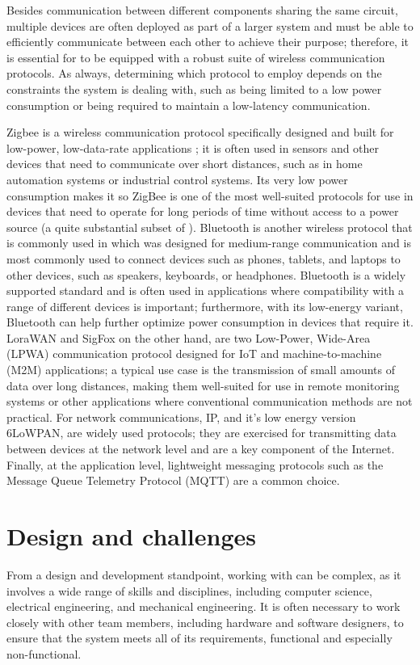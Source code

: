 Besides communication between different components sharing the same circuit, multiple devices are often deployed as part of a larger system and must be able to efficiently communicate between each other to achieve their purpose; therefore, it is essential for \ess to be equipped with a robust suite of wireless communication protocols. As always, determining which protocol to employ depends on the constraints the system is dealing with, such as being limited to a low power consumption or being required to maintain a low-latency communication.

Zigbee is a wireless communication protocol specifically designed and built for low-power, low-data-rate applications \cite{Zigbee}; it is often used in sensors and other devices that need to communicate over short distances, such as in home automation systems or industrial control systems. Its very low power consumption makes it so ZigBee is one of the most well-suited protocols for use in devices that need to operate for long periods of time without access to a power source (\ie a quite substantial subset of \ess).
Bluetooth is another wireless protocol that is commonly used in \es which was designed for medium-range communication and is most commonly used to connect devices such as phones, tablets, and laptops to other devices, such as speakers, keyboards, or headphones. Bluetooth is a widely supported standard and is often used in applications where compatibility with a range of different devices is important; furthermore, with its low-energy variant, Bluetooth can help further optimize power consumption in devices that require it.
LoraWAN and SigFox on the other hand, are two Low-Power, Wide-Area (LPWA) communication protocol designed for IoT and machine-to-machine (M2M) applications; a typical use case is the transmission of small amounts of data over long distances, making them well-suited for use in remote monitoring systems or other applications where conventional communication methods are not practical.
For network communications, IP, and it's low energy version 6LoWPAN, are widely used protocols; they are exercised for transmitting data between devices at the network level and are a key component of the Internet.
Finally, at the application level, lightweight messaging protocols such as the Message Queue Telemetry Protocol (MQTT) are a common choice.

\section{Design and challenges}
From a design and development standpoint, working with \ess can be complex, as it involves a wide range of skills and disciplines, including computer science, electrical engineering, and mechanical engineering. It is often necessary to work closely with other team members, including hardware and software designers, to ensure that the system meets all of its requirements, functional and especially non-functional.

